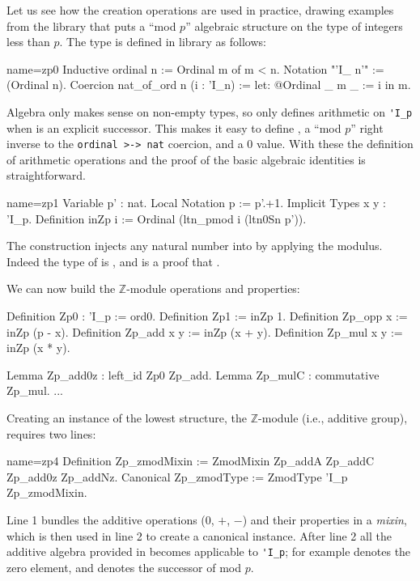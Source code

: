 Let us see how the creation operations are used in practice, drawing
examples from the  library that puts a ``mod $p$'' algebraic
structure on the type  of integers less than $p$.
The  type is defined in library  as follows:

\begin{coq}{name=zp0}{}
Inductive ordinal n := Ordinal m of m < n.
Notation "'I_ n'" := (Ordinal n).
Coercion nat_of_ord n (i : 'I_n) := let: @Ordinal _ m _ := i in m.
\end{coq}

Algebra only makes sense on non-empty types, so  only defines
arithmetic on \lstinline/'I_p/ when  is an explicit successor.
This makes it easy to define , a ``mod $p$'' right inverse to
the \lstinline/ordinal >-> nat/ coercion, and a 0 value. With these
the definition of arithmetic operations and the proof of the basic
algebraic identities is straightforward.

\begin{coq}{name=zp1}{}
Variable p' : nat.
Local Notation p := p'.+1.
Implicit Types x y : 'I_p.
Definition inZp i := Ordinal (ltn_pmod i (ltn0Sn p')).
\end{coq}
The  construction injects any natural number 
into  by applying the modulus.  Indeed the
type of  is ,
and  is a proof that .

We can now build the $\mathbb{Z}$-module operations and
properties:

\begin{coq}{}{}
Definition Zp0 : 'I_p := ord0.
Definition Zp1 := inZp 1.
Definition Zp_opp x := inZp (p - x).
Definition Zp_add x y := inZp (x + y).
Definition Zp_mul x y := inZp (x * y).

Lemma Zp_add0z : left_id Zp0 Zp_add.
Lemma Zp_mulC : commutative Zp_mul.
...
\end{coq}

Creating an instance of the lowest  structure, the
$\mathbb{Z}$-module (i.e., additive group), requires two lines:

\begin{coq}{name=zp4}{}
Definition Zp_zmodMixin := ZmodMixin Zp_addA Zp_addC Zp_add0z Zp_addNz.
Canonical Zp_zmodType := ZmodType 'I_p Zp_zmodMixin.
\end{coq}

Line 1 bundles the additive operations (0, $+$, $-$) and their
properties in a \emph{mixin}, which is then used in line 2 to create a
canonical instance. After line 2 all the additive algebra provided in
 becomes applicable to \lstinline/'I_p/; for example 
denotes the zero element, and  denotes the successor of  mod $p$.

